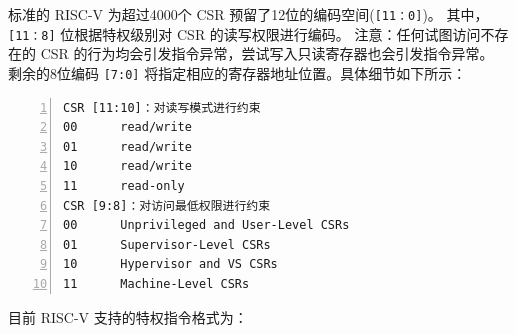 \documentclass{../runikraft-report}
\begin{document}
标准的 RISC-V 为超过4000个 CSR 预留了12位的编码空间(\texttt{[11：0]})。
其中，\texttt{[11：8]} 位根据特权级别对 CSR 的读写权限进行编码。
注意：任何试图访问不存在的 CSR 的行为均会引发指令异常，尝试写入只读寄存器也会引发指令异常。
剩余的8位编码 \texttt{[7:0]} 将指定相应的寄存器地址位置。具体细节如下所示：\cite{b}\cite{c}

\begin{lstlisting}[numbers=left]
CSR [11:10]：对读写模式进行约束
00		read/write
01		read/write
10		read/write
11		read-only
CSR [9:8]：对访问最低权限进行约束
00		Unprivileged and User-Level CSRs
01		Supervisor-Level CSRs
10		Hypervisor and VS CSRs
11		Machine-Level CSRs
\end{lstlisting}


目前 RISC-V 支持的特权指令格式为：
\end{document}
